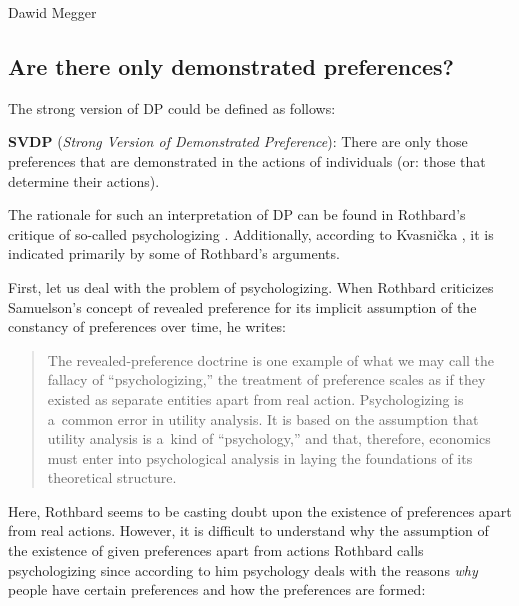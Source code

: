 \begin{artengenv}{Dawid Megger}
\subsection{Are there only demonstrated preferences?}



The strong version of DP could be defined as follows:

\medskip

\noindent \textbf{SVDP} (\textit{Strong Version of Demonstrated Preference}): There are only those preferences that are demonstrated in the actions of individuals (or: those that determine their actions).

\medskip

The rationale for such an interpretation of DP can be found in Rothbard's critique of so-called psychologizing 
\parencite[][pp.296–298]{rothbard_present_2011}. %
 Additionally, according to Kvasnička 
\parencite*[][]{kvasnicka_rothbards_2008}, %
 it is indicated primarily by some of Rothbard's arguments.



First, let us deal with the problem of psychologizing. When Rothbard criticizes Samuelson's concept of revealed preference for its implicit assumption of the constancy of preferences over time, he writes:



\begin{quote}
The revealed-preference doctrine is one example of what we may call the fallacy of ``psychologizing,'' the treatment of preference scales as if they existed as separate entities apart from real action. Psychologizing is a~common error in utility analysis. It is based on the assumption that utility analysis is a~kind of ``psychology,'' and that, therefore, economics must enter into psychological analysis in laying the foundations of its theoretical structure. 
\parencite[][p.296]{rothbard_present_2011}%
\end{quote}




Here, Rothbard seems to be casting doubt upon the existence of preferences apart from real actions. However, it is difficult to understand why the assumption of the existence of given preferences apart from actions Rothbard calls psychologizing since according to him psychology deals with the reasons \textit{why} people have certain preferences and how the preferences are formed:




\end{artengenv}
